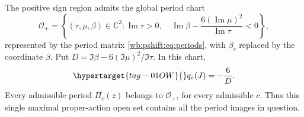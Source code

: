 \begin{proposition}\hypertarget{tag-01RD}{}\label{fam:src:F.2.3}\label{fam:st:F.2.3}

The positive sign region admits the global period chart
\[
 \mathcal O_+=\left\{
 (\tau,\mu,\beta)\in\mathbb C^3:
 \operatorname{Im}\tau>0,\quad
 \operatorname{Im}\beta-\frac{6(\operatorname{Im}\mu)^2}
 {\operatorname{Im}\tau}<0\right\},
\]
represented by the period matrix \eqref{wb:pshift:eq:periods}, with
$\beta_c$ replaced by the coordinate $\beta$. Put
$D=\Im\beta-6(\Im\mu)^2/\Im\tau$. In this chart,
\begin{equation}\hypertarget{tag-01OW}{}\label{fam:eq:F-qD}
 q_e(J)=-\frac6D.
\end{equation}
Every admissible period $\Pi_c(z)$ belongs to $\mathcal O_+$, for every
admissible $c$.  Thus this single maximal proper-action open set contains
all the period images in question.
\end{proposition}



